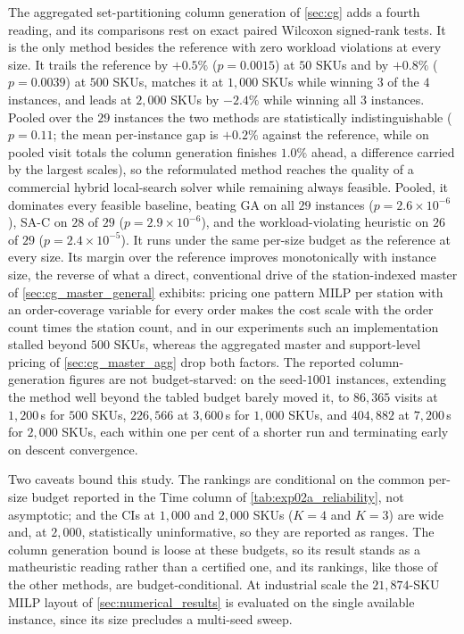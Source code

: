 \documentclass[preprint,review,11pt,authoryear]{elsarticle}
\begin{document}
The aggregated set-partitioning column generation of \cref{sec:cg} adds a fourth reading, and its comparisons rest on exact paired Wilcoxon signed-rank tests. It is the only method besides the reference with zero workload violations at every size. It trails the reference by $+0.5\%$ ($p=0.0015$) at $50$ SKUs and by $+0.8\%$ ($p=0.0039$) at $500$ SKUs, matches it at $1{,}000$ SKUs while winning $3$ of the $4$ instances, and leads at $2{,}000$ SKUs by $-2.4\%$ while winning all $3$ instances. Pooled over the $29$ instances the two methods are statistically indistinguishable ($p=0.11$; the mean per-instance gap is $+0.2\%$ against the reference, while on pooled visit totals the column generation finishes $1.0\%$ ahead, a difference carried by the largest scales), so the reformulated method reaches the quality of a commercial hybrid local-search solver while remaining always feasible. Pooled, it dominates every feasible baseline, beating GA on all $29$ instances ($p=2.6\times10^{-6}$), SA-C on $28$ of $29$ ($p=2.9\times10^{-6}$), and the workload-violating heuristic on $26$ of $29$ ($p=2.4\times10^{-5}$). It runs under the same per-size budget as the reference at every size. Its margin over the reference improves monotonically with instance size, the reverse of what a direct, conventional drive of the station-indexed master of \cref{sec:cg_master_general} exhibits: pricing one pattern MILP per station with an order-coverage variable for every order makes the cost scale with the order count times the station count, and in our experiments such an implementation stalled beyond $500$ SKUs, whereas the aggregated master and support-level pricing of \cref{sec:cg_master_agg} drop both factors. The reported column-generation figures are not budget-starved: on the seed-$1001$ instances, extending the method well beyond the tabled budget barely moved it, to $86{,}365$ visits at $1{,}200$\,s for $500$ SKUs, $226{,}566$ at $3{,}600$\,s for $1{,}000$ SKUs, and $404{,}882$ at $7{,}200$\,s for $2{,}000$ SKUs, each within one per cent of a shorter run and terminating early on descent convergence.

Two caveats bound this study. The rankings are conditional on the common per-size budget reported in the Time column of \cref{tab:exp02a_reliability}, not asymptotic; and the CIs at $1{,}000$ and $2{,}000$ SKUs ($K=4$ and $K=3$) are wide and, at $2{,}000$, statistically uninformative, so they are reported as ranges. The column generation bound is loose at these budgets, so its result stands as a matheuristic reading rather than a certified one, and its rankings, like those of the other methods, are budget-conditional. At industrial scale the $21{,}874$-SKU MILP layout of \cref{sec:numerical_results} is evaluated on the single available instance, since its size precludes a multi-seed sweep.
\end{document}

